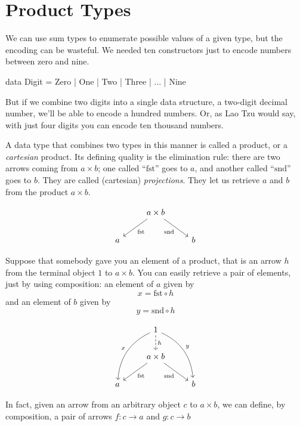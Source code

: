 \documentclass[DaoFP]{subfiles}
\begin{document}
\setcounter{chapter}{4}

\chapter{Product Types}

We can use sum types to enumerate possible values of a given type, but the encoding can be wasteful. We needed ten constructors just to encode numbers between zero and nine.
\begin{haskell}
data Digit = Zero | One | Two | Three | ... | Nine
\end{haskell}
But if we combine two digits into a single data structure, a two-digit decimal number, we'll be able to encode a hundred numbers. Or, as Lao Tzu would say, with just four digits you can encode ten thousand numbers.

A data type that combines two types in this manner is called a product, or a \emph{cartesian} product. Its defining quality is the elimination rule: there are two arrows coming from $a \times b$; one called ``$\text{fst}$'' goes to $a$, and another called ``$\text{snd}$'' goes to $b$. They are called (cartesian) \emph{projections}. They let us retrieve $a$ and $b$ from the product $a \times b$.

\[
 \begin{tikzcd}
& a \times b
 \arrow[dl,  "\text{fst}"]
 \arrow[dr,   "\text{snd}"']
\\
a && b
 \end{tikzcd}
\]

Suppose that somebody gave you an element of a product, that is an arrow $h$ from the terminal object $1$ to $a \times b$. You can easily retrieve a pair of elements, just by using composition: an element of $a$ given by 
\[x = \text{fst} \circ h \]
and an element of $b$ given by
\[y = \text{snd} \circ h \]

\[
 \begin{tikzcd}
 & 1
\arrow[d, dashed, "h"]
 \arrow[ddl, bend right, "x"']
 \arrow[ddr, bend left, "y"]
\\
&a \times b
 \arrow[dl,  "\text{fst}"]
 \arrow[dr,   "\text{snd}"']
\\
a && b
 \end{tikzcd}
\]

In fact, given an arrow from an arbitrary object $c$ to $a \times b$, we can define, by composition, a pair of arrows $f \colon c \to a$ and $g \colon c \to b$
\end{document}
